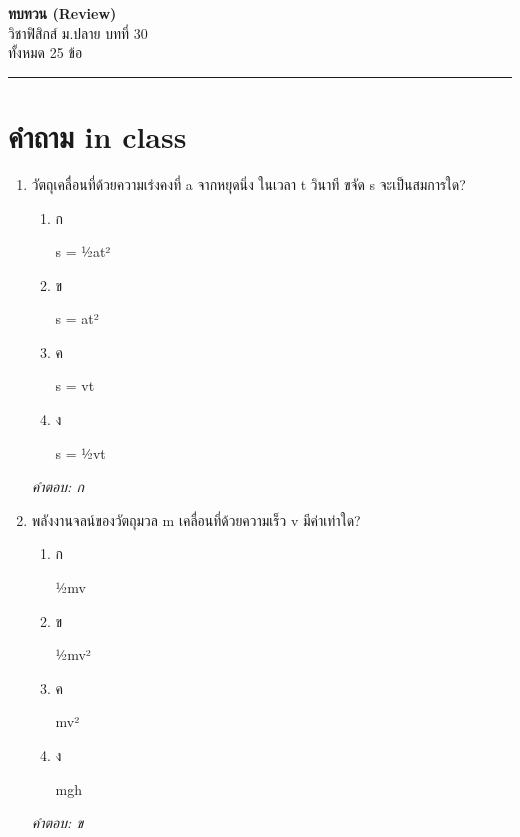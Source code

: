 \documentclass[12pt]{article}
\begin{document}
\begin{center}
{\Large\textbf{ทบทวน (Review)}}\\[6pt]
{\normalsize วิชาฟิสิกส์ ม.ปลาย บทที่ 30}\\[4pt]
{\footnotesize ทั้งหมด 25 ข้อ}
\end{center}
\hrule
\bigskip

\section*{คำถาม in class}
\begin{enumerate}[label=\arabic*., itemsep=0.5\baselineskip, topsep=0.5\baselineskip, leftmargin=*]
\item วัตถุเคลื่อนที่ด้วยความเร่งคงที่ a จากหยุดนิ่ง ในเวลา t วินาที ขจัด s จะเป็นสมการใด?
\begin{enumerate}[label=\alph*)., itemsep=0.3\baselineskip, topsep=0.3\baselineskip]
\item ก\ 
\begin{minipage}[t]{0.9\linewidth}
\raggedright s = ½at²
\end{minipage}
\item ข\ 
\begin{minipage}[t]{0.9\linewidth}
\raggedright s = at²
\end{minipage}
\item ค\ 
\begin{minipage}[t]{0.9\linewidth}
\raggedright s = vt
\end{minipage}
\item ง\ 
\begin{minipage}[t]{0.9\linewidth}
\raggedright s = ½vt
\end{minipage}
\end{enumerate}
\vspace{-0.3\baselineskip}
\begin{small}
\textit{คำตอบ: ก}
\end{small}

\item พลังงานจลน์ของวัตถุมวล m เคลื่อนที่ด้วยความเร็ว v มีค่าเท่าใด?
\begin{enumerate}[label=\alph*)., itemsep=0.3\baselineskip, topsep=0.3\baselineskip]
\item ก\ 
\begin{minipage}[t]{0.9\linewidth}
\raggedright ½mv
\end{minipage}
\item ข\ 
\begin{minipage}[t]{0.9\linewidth}
\raggedright ½mv²
\end{minipage}
\item ค\ 
\begin{minipage}[t]{0.9\linewidth}
\raggedright mv²
\end{minipage}
\item ง\ 
\begin{minipage}[t]{0.9\linewidth}
\raggedright mgh
\end{minipage}
\end{enumerate}
\vspace{-0.3\baselineskip}
\begin{small}
\textit{คำตอบ: ข}
\end{small}


\end{enumerate}
\end{document}
